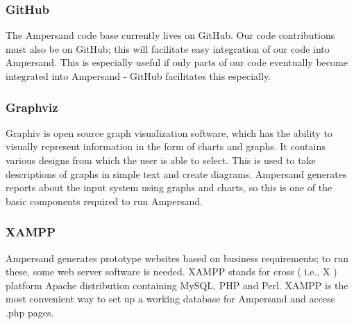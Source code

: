 \documentclass[12pt]{report}
\begin{document}
\subsubsection*{GitHub}
The Ampersand code base currently lives on GitHub. Our code contributions must
also be on GitHub; this will facilitate easy integration of our code into
Ampersand. This is especially useful if only parts of our code eventually become
integrated into Ampersand - GitHub facilitates this especially. 
%

\subsubsection*{Graphviz}
Graphiv is open source graph visualization software, which has the ability to
visually represent information in the form of charts and graphs. It contains
various designs from which the user is able to select. This is used to take
descriptions of graphs in simple text and create diagrams. Ampersand generates
reports about the input system using graphs and charts, so this is one of the
basic components required to run Ampersand.

\subsubsection*{XAMPP}
Ampersand generates prototype websites based on business requirements; to run
these, some web server software is needed. XAMPP stands for cross \big( i.e., X
\big) platform Apache distribution containing MySQL, PHP and Perl. XAMPP \cite{xampp} is the
most convenient way to set up a working database for Ampersand and access .php
pages. 

%
\end{document}
